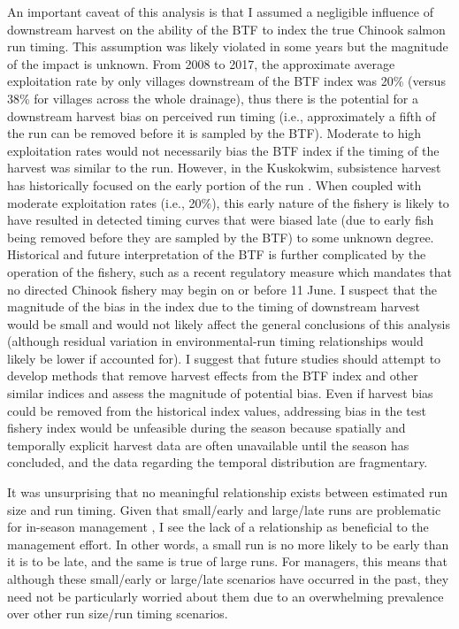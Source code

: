 \documentclass[12pt,]{book}
\theoremstyle{definition}
\theoremstyle{definition}
\theoremstyle{definition}
\theoremstyle{remark}
\begin{document}
An important caveat of this analysis is that I assumed a negligible
influence of downstream harvest on the ability of the BTF to index the
true Chinook salmon run timing. This assumption was likely violated in
some years but the magnitude of the impact is unknown. From 2008 to
2017, the approximate average exploitation rate by only villages
downstream of the BTF index was 20\% (versus 38\% for villages across
the whole drainage), thus there is the potential for a downstream
harvest bias on perceived run timing (i.e., approximately a fifth of the
run can be removed before it is sampled by the BTF). Moderate to high
exploitation rates would not necessarily bias the BTF index if the
timing of the harvest was similar to the run. However, in the Kuskokwim,
subsistence harvest has historically focused on the early portion of the
run \citep{hamazaki-2008}. When coupled with moderate exploitation rates
(i.e., 20\%), this early nature of the fishery is likely to have
resulted in detected timing curves that were biased late (due to early
fish being removed before they are sampled by the BTF) to some unknown
degree. Historical and future interpretation of the BTF is further
complicated by the operation of the fishery, such as a recent regulatory
measure which mandates that no directed Chinook fishery may begin on or
before 11 June. I suspect that the magnitude of the bias in the index
due to the timing of downstream harvest would be small and would not
likely affect the general conclusions of this analysis (although
residual variation in environmental-run timing relationships would
likely be lower if accounted for). I suggest that future studies should
attempt to develop methods that remove harvest effects from the BTF
index and other similar indices and assess the magnitude of potential
bias. Even if harvest bias could be removed from the historical index
values, addressing bias in the test fishery index would be unfeasible
during the season because spatially and temporally explicit harvest data
are often unavailable until the season has concluded, and the data
regarding the temporal distribution are fragmentary.

It was unsurprising that no meaningful relationship exists between
estimated run size and run timing. Given that small/early and large/late
runs are problematic for in-season management
\citep{adkison-cunningham-2015}, I see the lack of a relationship as
beneficial to the management effort. In other words, a small run is no
more likely to be early than it is to be late, and the same is true of
large runs. For managers, this means that although these small/early or
large/late scenarios have occurred in the past, they need not be
particularly worried about them due to an overwhelming prevalence over
other run size/run timing scenarios.
\end{document}
